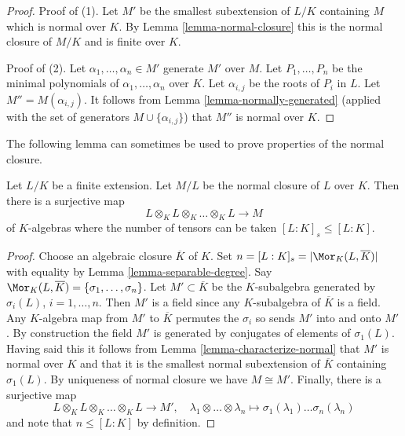 \begin{proof}
Proof of (1). Let $M'$ be the smallest subextension of $L/K$ containing $M$
which is normal over $K$. By Lemma \ref{lemma-normal-closure}
this is the normal closure of $M/K$ and is finite over $K$.

\medskip\noindent
Proof of (2). Let $\alpha_1, \ldots, \alpha_n \in M'$ generate $M'$ over $M$.
Let $P_1, \ldots, P_n$ be the minimal polynomials of
$\alpha_1, \ldots, \alpha_n$ over $K$. Let $\alpha_{i, j}$ be the roots
of $P_i$ in $L$. Let $M''  = M(\alpha_{i, j})$. It follows from
Lemma \ref{lemma-normally-generated}
(applied with the set of generators $M \cup \{\alpha_{i, j}\}$)
that $M''$ is normal over $K$.
\end{proof}

\noindent
The following lemma can sometimes be used to prove properties
of the normal closure.

\begin{lemma}
\label{lemma-normal-closure-tensor-product}
Let $L/K$ be a finite extension. Let $M/L$ be the normal
closure of $L$ over $K$. Then there is a surjective map
$$
L \otimes_K L \otimes_K \ldots \otimes_K L \longrightarrow M
$$
of $K$-algebras where the number of tensors can be taken
$[L : K]_s \leq [L : K]$.
\end{lemma}

\begin{proof}
Choose an algebraic closure $\overline{K}$ of $K$.
Set $n = [L : K]_s = |\Mor_K(L, \overline{K})|$ with equality by
Lemma \ref{lemma-separable-degree}.
Say $\Mor_K(L, \overline{K}) = \{\sigma_1, \ldots, \sigma_n\}$.
Let $M' \subset \overline{K}$ be the $K$-subalgebra
generated by $\sigma_i(L)$, $i = 1, \ldots, n$. Then $M'$ is
a field since any $K$-subalgebra of $\overline{K}$ is a field.
Any $K$-algebra map from $M'$ to $\overline{K}$ permutes the $\sigma_i$
so sends $M'$ into and onto $M'$. By construction the field $M'$
is generated by conjugates of elements of $\sigma_1(L)$. Having said
this it follows from Lemma \ref{lemma-characterize-normal}
that $M'$ is normal over $K$ and that it is the
smallest normal subextension of $\overline{K}$ containing
$\sigma_1(L)$. By uniqueness of normal closure we have $M \cong M'$.
Finally, there is a surjective map
$$
L \otimes_K L \otimes_K \ldots \otimes_K L \longrightarrow M',
\quad
\lambda_1 \otimes \ldots \otimes \lambda_n \longmapsto
\sigma_1(\lambda_1) \ldots \sigma_n(\lambda_n)
$$
and note that $n \leq [L : K]$ by definition.
\end{proof}













